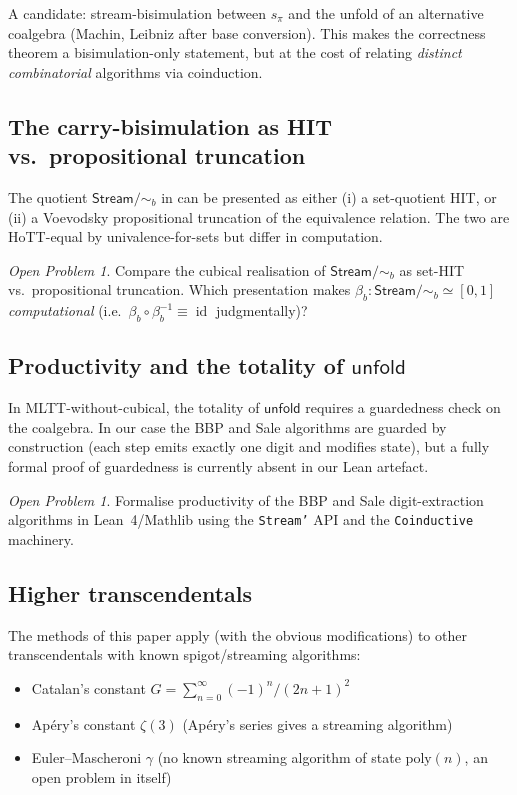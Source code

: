 \documentclass[12pt]{article}
\theoremstyle{definition}
\theoremstyle{remark}
\newtheorem{problem}[theorem]{Open Problem}
\newcommand{\Stream}{\mathsf{Stream}}
\newcommand{\unfold}{\mathsf{unfold}}
\newcommand{\bisim}{\mathrel{\sim}}
\DeclareMathOperator{\id}{id}
\begin{document}
A candidate: stream-bisimulation between $s_\pi$ and the unfold
of an alternative coalgebra (Machin, Leibniz after base
conversion). This makes the correctness theorem a
bisimulation-only statement, but at the cost of relating
\emph{distinct combinatorial} algorithms via coinduction.

\subsection{The carry-bisimulation as HIT vs.\ propositional truncation}

The quotient $\Stream/{\bisim_b}$ in  can
be presented as either (i) a set-quotient HIT, or (ii) a Voevodsky
propositional truncation of the equivalence relation. The two are
HoTT-equal by univalence-for-sets but differ in computation.

\begin{problem}\label{prob:carry-hit}
Compare the cubical realisation of $\Stream/{\bisim_b}$ as set-HIT
vs.\ propositional truncation. Which presentation makes
$\beta_b: \Stream/{\bisim_b} \simeq [0,1]$ \emph{computational}
(i.e.\ $\beta_b \circ \beta_b^{-1} \equiv \id$ judgmentally)?
\end{problem}

\subsection{\texorpdfstring{Productivity and the totality of $\unfold$}{Productivity and the totality of unfold}}

In MLTT-without-cubical, the totality of $\unfold$ requires a
guardedness check on the coalgebra. In our case the BBP and
Sale algorithms are guarded by construction (each step emits
exactly one digit and modifies state), but a fully formal
proof of guardedness is currently absent in our Lean
artefact.

\begin{problem}\label{prob:lean-productivity}
Formalise productivity of the BBP and Sale digit-extraction
algorithms in Lean~4/Mathlib using the \texttt{Stream'} API and
the \texttt{Coinductive} machinery.
\end{problem}

\subsection{Higher transcendentals}

The methods of this paper apply (with the obvious modifications) to other
transcendentals with known spigot/streaming algorithms:
\begin{itemize}
\item Catalan's constant $G = \sum_{n=0}^\infty (-1)^n/(2n+1)^2$
\item Apéry's constant $\zeta(3)$ (Apéry's series gives a streaming
algorithm)
\item Euler--Mascheroni $\gamma$ (no known streaming algorithm of
state $\mathrm{poly}(n)$, an open problem in itself)
\end{itemize}
\end{document}
